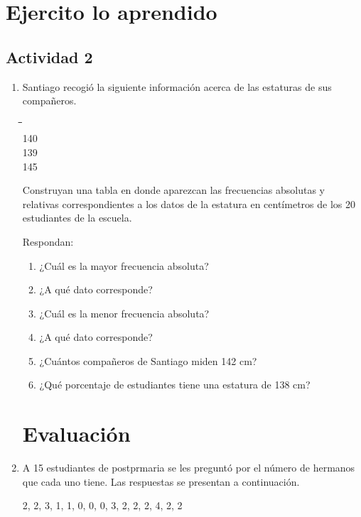 \documentclass[10pt,twoside]{article}
\begin{document}
\section*{Ejercito lo aprendido}
\subsection*{Actividad 2}
\begin{enumerate}
\item Santiago recogi\'{o} la siguiente informaci\'{o}n acerca de las estaturas de sus compañeros.
\begin{center}
\begin{tabbing}
\hspace{1.5cm}\=\hspace{1.5cm}\=\hspace{1.5cm}\=\hspace{1.5cm}\=    \\ 
140     \\ 
139    \\ 
145    
\end{tabbing} 
\end{center}
Construyan una tabla en donde aparezcan las frecuencias absolutas y relativas correspondientes a los datos de la estatura en centímetros de los 20 estudiantes de la escuela.

Respondan:
\begin{enumerate}
\item ¿Cuál es la mayor frecuencia absoluta?
\item ¿A qué dato corresponde?
\item ¿Cuál es la menor frecuencia absoluta?
\item ¿A qué dato corresponde?
\item ¿Cuántos compañeros de Santiago miden 142 cm?
\item ¿Qué porcentaje de estudiantes tiene una estatura de 138 cm?
\end{enumerate}
\section*{Evaluaci\'{o}n}
\item A 15 estudiantes de postprmaria se les preguntó por el número de hermanos que cada uno tiene. Las respuestas se presentan a continuación.
\begin{center}
2, 2, 3, 1, 1, 0, 0, 0, 3, 2, 2, 2, 4, 2, 2
\end{center}
\end{enumerate}
\end{document}
